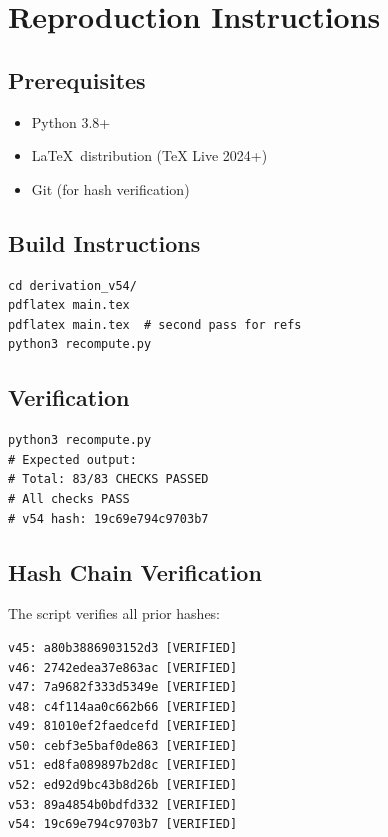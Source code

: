 \documentclass[11pt,a4paper]{article}
\begin{document}
\section{Reproduction Instructions}
\label{app:reproduction}

\subsection{Prerequisites}
\label{app:prereq}

\begin{canonbox}[Prerequisites]
\label{box:prereq}
\begin{itemize}
    \item Python 3.8+
    \item \LaTeX\ distribution (TeX Live 2024+)
    \item Git (for hash verification)
\end{itemize}
\end{canonbox}

\subsection{Build Instructions}
\label{app:build}

\begin{verbatim}
cd derivation_v54/
pdflatex main.tex
pdflatex main.tex  # second pass for refs
python3 recompute.py
\end{verbatim}

\subsection{Verification}
\label{app:verify}

\begin{verbatim}
python3 recompute.py
# Expected output:
# Total: 83/83 CHECKS PASSED
# All checks PASS
# v54 hash: 19c69e794c9703b7
\end{verbatim}

\subsection{Hash Chain Verification}
\label{app:hash-verify}

The script verifies all prior hashes:
\begin{verbatim}
v45: a80b3886903152d3 [VERIFIED]
v46: 2742edea37e863ac [VERIFIED]
v47: 7a9682f333d5349e [VERIFIED]
v48: c4f114aa0c662b66 [VERIFIED]
v49: 81010ef2faedcefd [VERIFIED]
v50: cebf3e5baf0de863 [VERIFIED]
v51: ed8fa089897b2d8c [VERIFIED]
v52: ed92d9bc43b8d26b [VERIFIED]
v53: 89a4854b0bdfd332 [VERIFIED]
v54: 19c69e794c9703b7 [VERIFIED]
\end{verbatim}
\end{document}
